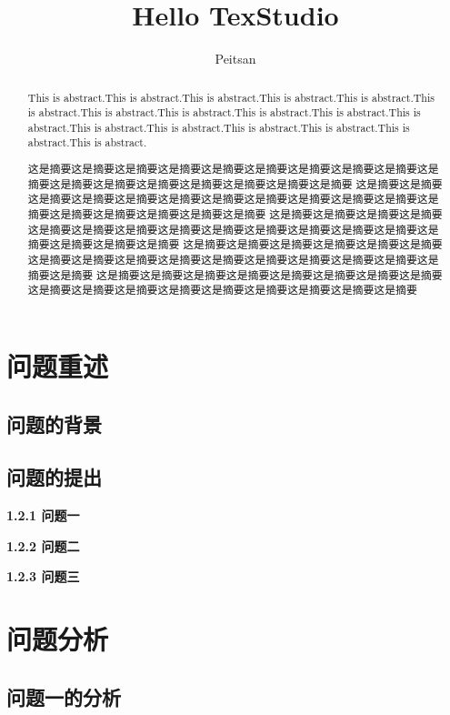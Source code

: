 \documentclass[]{article}   %
\title{Hello TexStudio}  %
\author{Peitsan}    %
\begin{document}
	\maketitle
	\begin{abstract}  %
		This is abstract.This is abstract.This is abstract.This is abstract.This is abstract.This is abstract.This is abstract.This is abstract.This is abstract.This is abstract.This is abstract.This is abstract.This is abstract.This is abstract.This is abstract.This is abstract.This is abstract.
		
		
		这是摘要这是摘要这是摘要这是摘要这是摘要这是摘要这是摘要这是摘要这是摘要这是摘要这是摘要这是摘要这是摘要这是摘要这是摘要这是摘要这是摘要	这是摘要这是摘要这是摘要这是摘要这是摘要这是摘要这是摘要这是摘要这是摘要这是摘要这是摘要这是摘要这是摘要这是摘要这是摘要这是摘要这是摘要	这是摘要这是摘要这是摘要这是摘要这是摘要这是摘要这是摘要这是摘要这是摘要这是摘要这是摘要这是摘要这是摘要这是摘要这是摘要这是摘要这是摘要	这是摘要这是摘要这是摘要这是摘要这是摘要这是摘要这是摘要这是摘要这是摘要这是摘要这是摘要这是摘要这是摘要这是摘要这是摘要这是摘要这是摘要	这是摘要这是摘要这是摘要这是摘要这是摘要这是摘要这是摘要这是摘要这是摘要这是摘要这是摘要这是摘要这是摘要这是摘要这是摘要这是摘要这是摘要
	\end{abstract}
	
	\newpage
	
	\tableofcontents %
	
	\newpage
	\section{问题重述}
	\subsection{问题的背景}
	\subsection{问题的提出}
	
	\noindent\textbf{1.2.1 问题一}
	
	\noindent\textbf{1.2.2 问题二}
	
	\noindent\textbf{1.2.3 问题三}
	
	\section{问题分析}
	\subsection{问题一的分析}
\end{document}
